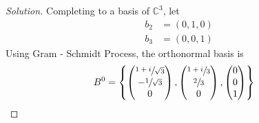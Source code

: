 \documentclass[fleqn, a4paper, 12pt]{article}
\theoremstyle{definition}
\theoremstyle{theorem}
\newenvironment{solution}
{\begin{proof}[Solution]\let\qed\relax}
	{\end{proof}}
\begin{document}
\begin{solution}
	Completing to a basis of $\mathbb{C}^3$, let
	\begin{align*}
		b_2 &= (0,1,0)\\
		b_3 &= (0,0,1)
	\end{align*}
	Using Gram - Schmidt Process, the orthonormal basis is
	\begin{align*}
		B^0 &=
			\left\lbrace
				\begin{pmatrix}
					\sfrac{1 + i}{\sqrt{3}}\\
					-\sfrac{1}{\sqrt{3}}\\
					0\\
				\end{pmatrix}
				,
				\begin{pmatrix}
					\sfrac{1 + i}{3}\\
					\sfrac{2}{3}\\
					0\\
				\end{pmatrix}
				,
				\begin{pmatrix}
					0\\
					0\\
					1\\
				\end{pmatrix}
			\right\rbrace
	\end{align*}
\end{solution}
\end{document}
